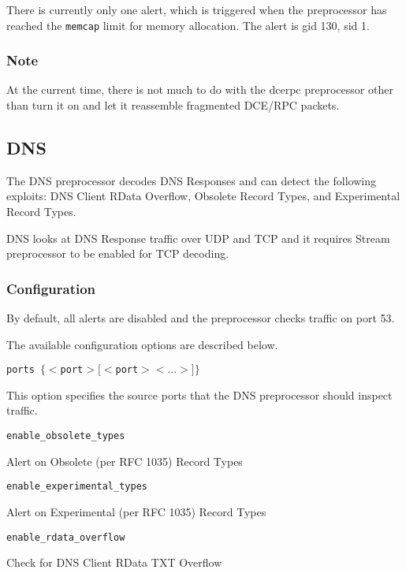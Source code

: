 \documentclass[english]{report}
\newcounter{slistnum}
\newenvironment{slist}
{ \begin{list}{ {\bf \arabic{slistnum}.} }{\usecounter{slistnum} } }
{ \end{list} }
\begin{document}
There is currently only one alert, which is triggered when the preprocessor has
reached the \texttt{memcap} limit for memory allocation.  The alert is gid 130,
sid 1.

\subsubsection{Note}

At the current time, there is not much to do with the dcerpc preprocessor other
than turn it on and let it reassemble fragmented DCE/RPC packets.

\subsection{DNS}
\label{sub:dns}

The DNS preprocessor decodes DNS Responses and can detect the following
exploits: DNS Client RData Overflow, Obsolete Record Types, and Experimental
Record Types.

DNS looks at DNS Response traffic over UDP and TCP and it requires Stream
preprocessor to be enabled for TCP decoding.

\subsubsection{Configuration}

By default, all alerts are disabled and the preprocessor checks traffic on port
53.

The available configuration options are described below.

\begin{slist}

\item \texttt{ports $\{ <$port$> [<$port$> <...>] \}$}

This option specifies the source ports that the DNS preprocessor should inspect
traffic.

\item \texttt{enable\_obsolete\_types}

Alert on Obsolete (per RFC 1035) Record Types

\item \texttt{enable\_experimental\_types}

Alert on Experimental (per RFC 1035) Record Types

\item \texttt{enable\_rdata\_overflow}

Check for DNS Client RData TXT Overflow

\end{slist}
\end{document}
